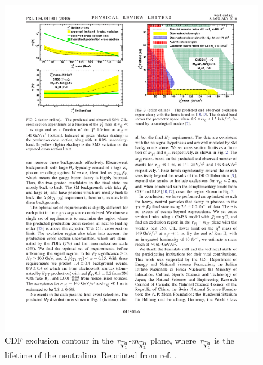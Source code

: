 \documentclass[dissertation.tex]{subfiles}
\begin{document}
\begin{figure}
	\centering
	\includegraphics[scale=1.0]{CDF_lifetime_vs_mass}
	\caption{CDF exclusion contour in the $\tau_{\widetilde{\chi}_{1}^{0}}$-$m_{\widetilde{\chi}_{1}^{0}}$ plane, where $\tau_{\widetilde{\chi}_{1}^{0}}$ is the lifetime of the neutralino.  Reprinted from ref. \cite{CDF_2010_GMSB_paper}.}
	\label{fig:CDF_lifetime_vs_mass}
\end{figure}
\end{document}
